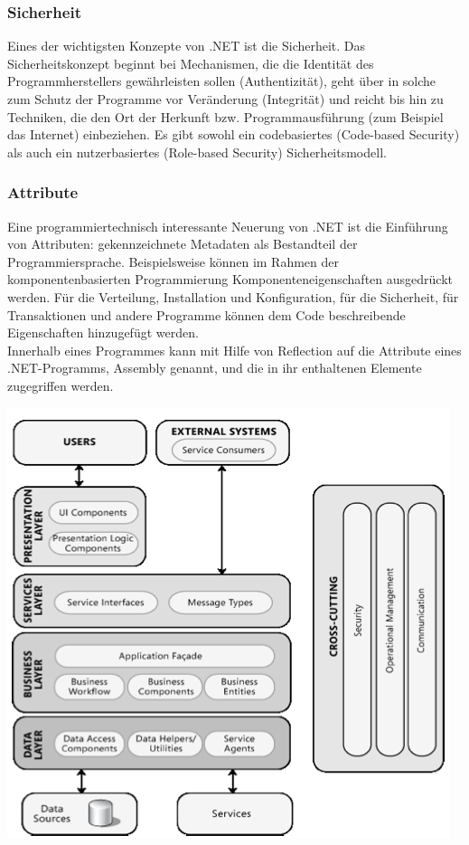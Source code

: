 \documentclass[10pt]{article}
\begin{document}
\subsubsection{Sicherheit}
Eines der wichtigsten Konzepte von .NET ist die Sicherheit. Das Sicherheitskonzept beginnt bei Mechanismen, die die Identität des Programmherstellers gewährleisten sollen (Authentizität), geht über in solche zum Schutz der Programme vor Veränderung (Integrität) und reicht bis hin zu Techniken, die den Ort der Herkunft bzw. Programmausführung (zum Beispiel das Internet) einbeziehen. Es gibt sowohl ein codebasiertes (Code-based Security) als auch ein nutzerbasiertes (Role-based Security) Sicherheitsmodell.
\subsubsection{Attribute}
Eine programmiertechnisch interessante Neuerung von .NET ist die Einführung von Attributen: gekennzeichnete Metadaten als Bestandteil der Programmiersprache. Beispielsweise können im Rahmen der komponentenbasierten Programmierung Komponenteneigenschaften ausgedrückt werden. Für die Verteilung, Installation und Konfiguration, für die Sicherheit, für Transaktionen und andere Programme können dem Code beschreibende Eigenschaften hinzugefügt werden. \\
Innerhalb eines Programmes kann mit Hilfe von Reflection auf die Attribute eines .NET-Programms, Assembly genannt, und die in ihr enthaltenen Elemente zugegriffen werden.
\begin{center}
	\includegraphics[scale=0.5]{enterprice_architecture.png}
\end{center}
\end{document}
